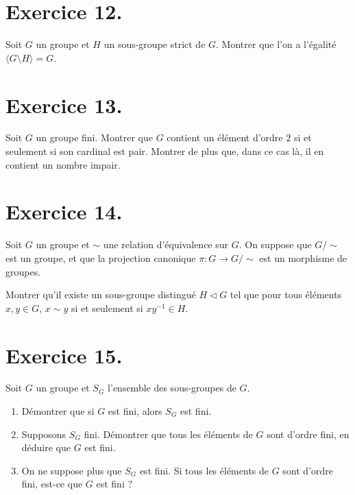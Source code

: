 \documentclass[./main]{subfiles}
\begin{document}
  \section{Exercice 12.}
  \begin{enonce}
    Soit $G$ un groupe et $H$ un sous-groupe strict de $G$. Montrer que l'on a l'égalité $\langle G \setminus H \rangle = G$.
  \end{enonce}

  \section{Exercice 13.}

  \begin{enonce}
    Soit $G$ un groupe fini.
    Montrer que $G$ contient un élément d'ordre $2$ si et seulement si son cardinal est pair. Montrer de plus que, dans ce cas là, il en contient un nombre impair.
  \end{enonce}

  \section{Exercice 14.}
  
  \begin{enonce}
    Soit $G$ un groupe et $\sim$ une relation d'équivalence sur $G$. On suppose que $G / {\sim}$ est un groupe, et que la projection canonique  $\pi : G \to G/{\sim}$ est un morphisme de groupes.
    
    Montrer qu'il existe un sous-groupe distingué $H \triangleleft G$ tel que pour tous éléments $x, y\in G$, $x\sim y$ si et seulement si $x y^{-1} \in H$.
  \end{enonce}

  \section{Exercice 15.}

  \begin{enonce}
    Soit $G$ un groupe et $S_G$ l'ensemble des sous-groupes de $G$.
    \begin{enumerate}
      \item Démontrer que si $G$ est fini, alors $S_G$ est fini.
      \item Supposons $S_G$ fini. Démontrer que tous les éléments de $G$ sont d'ordre fini, en déduire que $G$ est fini.
      \item On ne suppose plus que $S_G$ est fini. Si tous les éléments de $G$ sont d'ordre fini, est-ce que $G$ est fini ?
    \end{enumerate}
  \end{enonce}
\end{document}
